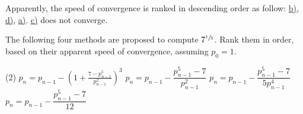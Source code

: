 \documentclass[../../../../Assignments]{subfiles}
\begin{document}
\begin{solution}
    Apparently, the speed of convergence is ranked in descending order as
    follow: \hyperref[exer:2.2.3:b]{b)}, \hyperref[exer:2.2.3:d]{d)},
    \hyperref[exer:2.2.3:a]{a)}. \hyperref[exer:2.2.3:c]{c)} does not converge.
\end{solution}

\begin{exercise}
    The following four methods are proposed to compute \(7^{\sfrac{1}{5}}\).
    Rank them in order, based on their apparent speed of convergence, assuming
    \(p_0 = 1\).

    \begin{tasks}(2)
        \task \(p_n = p_{n - 1} - \left(1 + \frac{7 - p_{n - 1}^5}{p_{n - 1}^2}\right)^3\) \label{exer:2.2.4:a}
        \task \(p_n = p_{n - 1} - \dfrac{p_{n - 1}^5 - 7}{p_{n - 1}^2}\)                   \label{exer:2.2.4:b}
        \task \(p_n = p_{n - 1} - \dfrac{p_{n - 1}^5 - 7}{5 p_{n - 1}^4}\)                 \label{exer:2.2.4:c}
        \task \(p_n = p_{n - 1} - \dfrac{p_{n - 1}^5 - 7}{12}\)                            \label{exer:2.2.4:d}
    \end{tasks}
\end{exercise}
\end{document}
